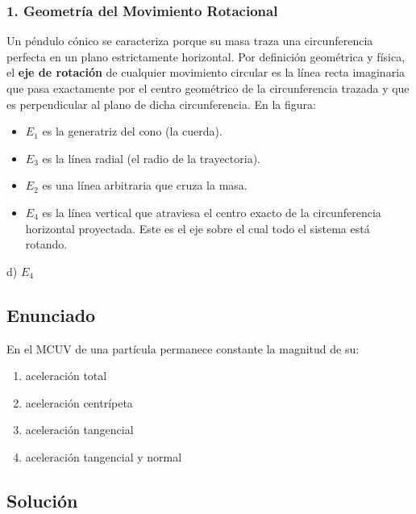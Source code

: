\documentclass[12pt, a4paper]{article}
\begin{document}
\subsubsection*{1. Geometría del Movimiento Rotacional}
Un péndulo cónico se caracteriza porque su masa traza una circunferencia perfecta en un plano estrictamente horizontal. 
Por definición geométrica y física, el \textbf{eje de rotación} de cualquier movimiento circular es la línea recta imaginaria que pasa exactamente por el centro geométrico de la circunferencia trazada y que es perpendicular al plano de dicha circunferencia.
En la figura:
\begin{itemize}
    \item $E_1$ es la generatriz del cono (la cuerda).
    \item $E_3$ es la línea radial (el radio de la trayectoria).
    \item $E_2$ es una línea arbitraria que cruza la masa.
    \item $E_4$ es la línea vertical que atraviesa el centro exacto de la circunferencia horizontal proyectada. Este es el eje sobre el cual todo el sistema está rotando.
\end{itemize}

\begin{tcolorbox}[colback=green!5!white, colframe=green!50!black, title=Respuesta Final]
\centering \Large d) $E_4$
\end{tcolorbox}

\newpage

\subsection*{Enunciado}
En el MCUV de una partícula permanece constante la magnitud de su:
\begin{enumerate}[label=\alph*)]
    \item aceleración total
    \item aceleración centrípeta
    \item aceleración tangencial
    \item aceleración tangencial y normal
\end{enumerate}

\subsection*{Solución}
\end{document}
